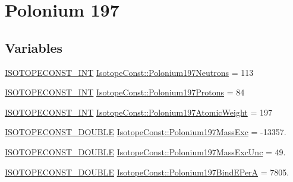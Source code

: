 \hypertarget{group___isotope_const-_polonium-_po197}{}\section{Polonium 197}
\label{group___isotope_const-_polonium-_po197}
\subsection*{Variables}
\begin{DoxyCompactItemize}
\item 
\mbox{\hyperlink{group___isotope_const-_macros_ga5f18360b3e99483a35c32d789e62621c}{I\+S\+O\+T\+O\+P\+E\+C\+O\+N\+S\+T\+\_\+\+I\+NT}} \mbox{\hyperlink{group___isotope_const-_polonium-_po197_gac81cfe4b6ad6574e97964621268be604}{Isotope\+Const\+::\+Polonium197\+Neutrons}} = 113
\item 
\mbox{\hyperlink{group___isotope_const-_macros_ga5f18360b3e99483a35c32d789e62621c}{I\+S\+O\+T\+O\+P\+E\+C\+O\+N\+S\+T\+\_\+\+I\+NT}} \mbox{\hyperlink{group___isotope_const-_polonium-_po197_ga1306698747c1e4755c634baee6861b77}{Isotope\+Const\+::\+Polonium197\+Protons}} = 84
\item 
\mbox{\hyperlink{group___isotope_const-_macros_ga5f18360b3e99483a35c32d789e62621c}{I\+S\+O\+T\+O\+P\+E\+C\+O\+N\+S\+T\+\_\+\+I\+NT}} \mbox{\hyperlink{group___isotope_const-_polonium-_po197_ga053b075c73e7a789bc44ed624dcf2053}{Isotope\+Const\+::\+Polonium197\+Atomic\+Weight}} = 197
\item 
\mbox{\hyperlink{group___isotope_const-_macros_ga8f45a7272ce02c0b4c65c44636ed719a}{I\+S\+O\+T\+O\+P\+E\+C\+O\+N\+S\+T\+\_\+\+D\+O\+U\+B\+LE}} \mbox{\hyperlink{group___isotope_const-_polonium-_po197_gaa797fffd25485da094dac333c0c48b5d}{Isotope\+Const\+::\+Polonium197\+Mass\+Exc}} = -\/13357.
\item 
\mbox{\hyperlink{group___isotope_const-_macros_ga8f45a7272ce02c0b4c65c44636ed719a}{I\+S\+O\+T\+O\+P\+E\+C\+O\+N\+S\+T\+\_\+\+D\+O\+U\+B\+LE}} \mbox{\hyperlink{group___isotope_const-_polonium-_po197_ga73ae4e97ca1327c57eec6bbf1ca27294}{Isotope\+Const\+::\+Polonium197\+Mass\+Exc\+Unc}} = 49.
\item 
\mbox{\hyperlink{group___isotope_const-_macros_ga8f45a7272ce02c0b4c65c44636ed719a}{I\+S\+O\+T\+O\+P\+E\+C\+O\+N\+S\+T\+\_\+\+D\+O\+U\+B\+LE}} \mbox{\hyperlink{group___isotope_const-_polonium-_po197_ga9dfe50073cf5c08e5af848aeaea9d64d}{Isotope\+Const\+::\+Polonium197\+Bind\+E\+PerA}} = 7805.
\item 

\end{DoxyCompactItemize}
